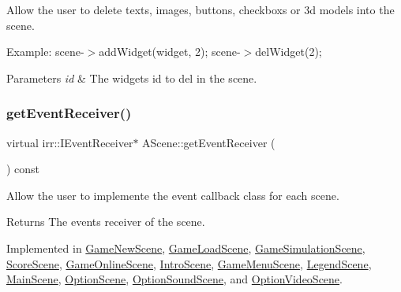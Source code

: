 Allow the user to delete texts, images, buttons, checkboxs or 3d models into the scene. 

Example\+: scene-\/$>$add\+Widget(widget, 2); scene-\/$>$del\+Widget(2);


\begin{DoxyParams}{Parameters}
{\em id} & The widget\textquotesingle{}s id to del in the scene. \\
\hline
\end{DoxyParams}
\mbox{\label{classAScene_af521e5e6d30a5d2e5d30eb333e4d3abd}} 
\subsubsection{\texorpdfstring{get\+Event\+Receiver()}{getEventReceiver()}}
{\footnotesize\ttfamily virtual irr\+::\+I\+Event\+Receiver$\ast$ A\+Scene\+::get\+Event\+Receiver (\begin{DoxyParamCaption}{ }\end{DoxyParamCaption}) const\hspace{0.3cm}{\ttfamily [pure virtual]}}



Allow the user to implemente the event callback class for each scene. 

\begin{DoxyReturn}{Returns}
The events\textquotesingle{} receiver of the scene. 
\end{DoxyReturn}


Implemented in \hyperlink{classGameNewScene_a21c27ef3ea1923d975683e1bcdd134fa}{Game\+New\+Scene}, \hyperlink{classGameLoadScene_a81807790ad65bd2cf97a1e543cae2b74}{Game\+Load\+Scene}, \hyperlink{classGameSimulationScene_a048b2a937caff3af7b4d54f8bd404ec1}{Game\+Simulation\+Scene}, \hyperlink{classScoreScene_ae398ba58a33b3605a0c71265202534e2}{Score\+Scene}, \hyperlink{classGameOnlineScene_a00ce9773db4f1886fc463b023cbf63f9}{Game\+Online\+Scene}, \hyperlink{classIntroScene_acabf925dab7b2a346edd398445cd5800}{Intro\+Scene}, \hyperlink{classGameMenuScene_adcb01430b24486c4e5d0157fc32d7611}{Game\+Menu\+Scene}, \hyperlink{classLegendScene_ab11340ae844c04d704f28e1ef188deae}{Legend\+Scene}, \hyperlink{classMainScene_af9fbc6337aa6ff42447c702e91e77237}{Main\+Scene}, \hyperlink{classOptionScene_a8848b9040ee7fd9c1d05a22181c5e053}{Option\+Scene}, \hyperlink{classOptionSoundScene_ac71da65763f0db4b05fc32444308b677}{Option\+Sound\+Scene}, and \hyperlink{classOptionVideoScene_a84625e871c5176d7abc77a7f12c1472a}{Option\+Video\+Scene}.

